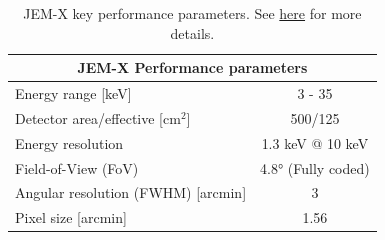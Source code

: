 
        \begin{table}[H]
        \centering
        \begin{tabular}{@{}lc@{}}
        \toprule
        \multicolumn{2}{c}{\textbf{JEM-X Performance parameters}} \\ \midrule
        Energy range [keV]                  & 3 - 35              \\
        Detector area/effective [cm$^2$]    & 500/125             \\
        Energy resolution                   & 1.3 keV @ 10 keV    \\
        Field-of-View (FoV)                 & 4.8° (Fully coded)  \\
        Angular resolution (FWHM) [arcmin]  & 3                   \\ 
        Pixel size [arcmin]                 & 1.56               
        \end{tabular}
        \caption{JEM-X key performance parameters. See \href{https://www.cosmos.esa.int/web/integral/instruments-jemx}{here} for more details.}
        \label{jemx_perf}
        \end{table}
        
